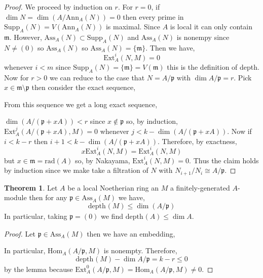 \documentclass[12pt]{article}
\newcommand{\Ext}[4]{\mathrm{Ext}^{#1}_{#2} \left( #3, #4 \right)}
\newcommand{\Homover}[3]{\mathrm{Hom}_{#1} \left( #2, #3 \right)}
\newcommand{\Ann}[2]{\mathrm{Ann}_{#1}\left(#2\right)}
\newcommand{\Ass}[2]{\mathrm{Ass}_{#1}\left( #2 \right)}
\newcommand{\Supp}[2]{\mathrm{Supp}_{#1}\left( #2 \right)}
\newcommand{\rad}[1]{\mathrm{rad}\left( #1 \right)}
\newcommand{\depth}[2]{\mathrm{depth}_{#1}\left(#2\right)}
\newcommand{\p}{\mathfrak{p}}
\newcommand{\m}{\mathfrak{m}}
\theoremstyle{remark}
\theoremstyle{definition}
\newtheorem{theorem}{Theorem}[section]
\begin{document}
\begin{proof}
We proceed by induction on $r$. For $r = 0$, if $\dim{N} = \dim{(A / \Ann{A}{N})} = 0$ then every prime in $\Supp{A}{N} = V(\Ann{A}{N})$ is maximal. Since $A$ is local it can only contain $\m$. However, $\Ass{A}{N} \subset \Supp{A}{N}$ and $\Ass{A}{N}$ is nonempy since $N \neq (0)$ so $\Ass{A}{N}$ so $\Ass{A}{N} = \{ \m \}$. Then we have,
\[ \Ext{i}{A}{N}{M} = 0 \]
whenever $i < m$ since $\Supp{A}{N} = \{ \m \} = V(\m)$ this is the definition of depth. Now for $r > 0$ we can reduce to the case that $N = A / \p$ with $\dim{A / \p} = r$. Pick $x \in \m \setminus \p$ then consider the exact sequence,
\begin{center}
\end{center}
From this sequence we get a long exact sequence,
\begin{center}
\end{center}
$\dim{(A / (\p + x A))} < r$ since $x \notin \p$ so, by induction, $\Ext{j}{A}{A / (\p + x A)}{M} = 0$ whenever $j < k - \dim{(A /(\p + x A ))}$. Now if $i < k  - r$ then $i + 1 < k - \dim{(A /(\p + x A ))}$. Therefore, by exactness,
\[ x \Ext{i}{A}{N}{M}  = \Ext{i}{A}{N}{M} \]
but $x \in \m = \rad{A}$ so, by Nakayama, $\Ext{i}{A}{N}{M} = 0$. Thus the claim holds by induction since we make take a filtration of $N$ with $N_{i+1} / N_i \cong A / \p$.  
\end{proof}

\begin{theorem}
Let $A$ be a local Noetherian ring an $M$ a finitely-generated $A$-module then for any $\p \in \Ass{A}{M}$ we have,
\[ \depth{}{M} \le \dim{(A / \p)} \]
In particular, taking $\p = (0)$ we find $\depth{}{A} \le \dim{A}$.
\end{theorem}

\begin{proof}
Let $\p \in \Ass{A}{M}$ then we have an embedding,
\begin{center}
\end{center}
In particular, $\Homover{A}{A / \p}{M}$ is nonempty. Therefore,
\[ \depth{}{M} - \dim{A / \p} = k - r \le 0 \]
by the lemma because $\Ext{0}{A}{A / \p}{M} = \Homover{A}{A / \p}{M} \neq 0$. 
\end{proof}
\end{document}
